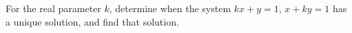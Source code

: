For the real parameter $k$, determine when the system $kx+y=1$, $x+ky=1$ has a unique solution, and find that solution.
